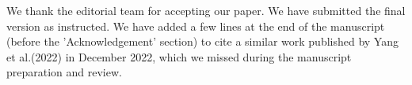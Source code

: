 We thank the editorial team for accepting our paper. We have submitted the final version as instructed. We have added a few lines at the end of the manuscript (before the 'Acknowledgement' section) to cite a similar work published by Yang et al.(2022) in December 2022, which we missed during the manuscript preparation and review. 